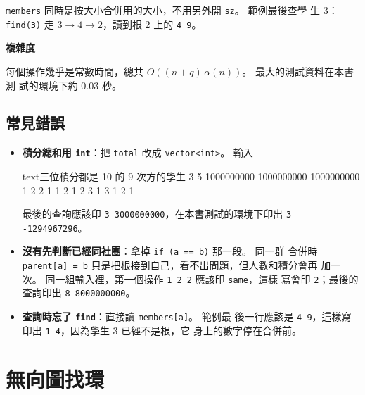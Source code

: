
\texttt{members} 同時是按大小合併用的大小，不用另外開 \texttt{sz}。 範例最後查學
生 3：\texttt{find(3)} 走 $3 \to 4 \to 2$，讀到根 2 上的 \texttt{4 9}。

\textbf{複雜度}

每個操作幾乎是常數時間，總共 $O((n + q)\,\alpha(n))$。 最大的測試資料在本書測
試的環境下約 $0.03$ 秒。

\subsection{常見錯誤}

\begin{itemize}
\item \textbf{積分總和用 \texttt{int}}：把 \texttt{total} 改成
\texttt{vector<int>}。 輸入
\begin{code}{text}{三位積分都是 10 的 9 次方的學生}
3 5
1000000000 1000000000 1000000000
1 2 2
1 1 2
1 2 3
1 3 1
2 1
\end{code}
最後的查詢應該印 \texttt{3 3000000000}，在本書測試的環境下印出
\texttt{3 -1294967296}。
\item \textbf{沒有先判斷已經同社團}：拿掉 \texttt{if (a == b)} 那一段。 同一群
合併時 \texttt{parent[a] = b} 只是把根接到自己，看不出問題，但人數和積分會再
加一次。 同一組輸入裡，第一個操作 \texttt{1 2 2} 應該印 \texttt{same}，這樣
寫會印 \texttt{2}；最後的查詢印出 \texttt{8 8000000000}。
\item \textbf{查詢時忘了 \texttt{find}}：直接讀 \texttt{members[a]}。 範例最
後一行應該是 \texttt{4 9}，這樣寫印出 \texttt{1 4}，因為學生 3 已經不是根，它
身上的數字停在合併前。
\end{itemize}

\section{無向圖找環}
\label{sec:cycle-undirected}

